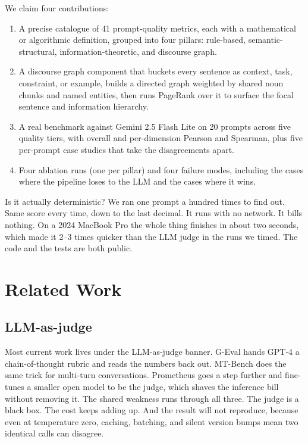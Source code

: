 \documentclass[conference]{IEEEtran}
\begin{document}
We claim four contributions:
\begin{enumerate}
\item A precise catalogue of 41 prompt-quality metrics, each with a mathematical or algorithmic definition, grouped into four pillars: rule-based, semantic-structural, information-theoretic, and discourse graph.
\item A discourse graph component that buckets every sentence as context, task, constraint, or example, builds a directed graph weighted by shared noun chunks and named entities, then runs PageRank over it to surface the focal sentence and information hierarchy.
\item A real benchmark against Gemini 2.5 Flash Lite on 20 prompts across five quality tiers, with overall and per-dimension Pearson and Spearman, plus five per-prompt case studies that take the disagreements apart.
\item Four ablation runs (one per pillar) and four failure modes, including the cases where the pipeline loses to the LLM and the cases where it wins.
\end{enumerate}

Is it actually deterministic? We ran one prompt a hundred times to find out. Same score every time, down to the last decimal. It runs with no network. It bills nothing. On a 2024 MacBook Pro the whole thing finishes in about two seconds, which made it 2--3 times quicker than the LLM judge in the runs we timed. The code and the tests are both public.

\section{Related Work}

\subsection{LLM-as-judge}
Most current work lives under the LLM-as-judge banner. G-Eval \cite{geval} hands GPT-4 a chain-of-thought rubric and reads the numbers back out. MT-Bench \cite{mtbench} does the same trick for multi-turn conversations. Prometheus \cite{prometheus} goes a step further and fine-tunes a smaller open model to be the judge, which shaves the inference bill without removing it. The shared weakness runs through all three. The judge is a black box. The cost keeps adding up. And the result will not reproduce, because even at temperature zero, caching, batching, and silent version bumps mean two identical calls can disagree.
\end{document}
